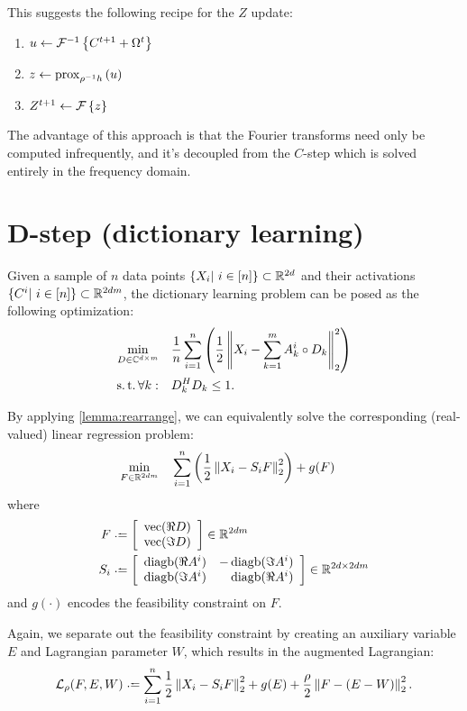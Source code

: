 \documentclass{article}
\DeclareMathOperator{\diagb}{diagb}
\DeclareMathOperator{\vectorize}{vec}
\renewcommand{\C}{\ensuremath{\mathbb{C}}}
\begin{document}
This suggests the following recipe for the $Z$ update:
\begin{enumerate}
\item $u \leftarrow \mathcal{F}^{-1}\left\{C^{t+1} + \Omega^t \right\}$
\item $z \leftarrow \operatorname{prox}_{\rho^{-1}h} \left(u\right)$
\item $Z^{t+1} \leftarrow \mathcal{F}\left\{z\right\}$
\end{enumerate}
The advantage of this approach is that the Fourier transforms need only be computed infrequently, and it's decoupled from
the $C$-step which is solved entirely in the frequency domain.

\section{D-step (dictionary learning)}
Given a sample of $n$ data points $\{X_i |~ i \in [n] \} \subset \mathbb{R}^{2d}$ and their activations 
$\{C^i |~ i \in [n] \} \subset \mathbb{R}^{2dm}$, the dictionary learning problem can be posed as the following
optimization:
\begin{align}
\min_{D\in \C^{d\times m}} \quad&\frac{1}{n} \sum_{i=1}^n \left(\frac{1}{2} \left\|X_i - \sum_{k=1}^m A^i_k
\circ D_k \right\|_2^2\right)\label{eq:siscd}\\
\suchthat \forall k: \quad & D_k^H D_k \leq 1.\notag
\end{align}

By applying \autoref{lemma:rearrange}, we can equivalently solve the corresponding (real-valued) linear regression problem:
\begin{align}
\min_{F\in \mathbb{R}^{2dm}} \quad& \sum_{i=1}^n \left(\frac{1}{2} \left\|X_i - S_i F\right\|_2^2\right) + g(F)\label{eq:siscdmf}
\end{align}
where
\begin{align*}
F &\defeq \left[\begin{array}{c}
\vectorize(\Re D)\\
\vectorize(\Im D)
\end{array}\right] \in \R^{2dm}\\
S_i &\defeq \left[\begin{array}{rr}
\diagb(\Re A^i) & -\diagb(\Im A^i)\\
\diagb(\Im A^i) & \diagb(\Re A^i)
\end{array}\right] \in \R^{2d \times 2dm}
\end{align*}
and $g(\cdot)$ encodes the feasibility constraint on $F$.

Again, we separate out the feasibility constraint by creating an auxiliary variable $E$ and Lagrangian parameter $W$, which results in the augmented Lagrangian:
\[
\Ell_\rho(F,E,W) \defeq \sum_{i=1}^n \frac{1}{2} \left\| X_i - S_i F\right\|_2^2 + g(E) + \frac{\rho}{2} \left\| F - (E - W)\right\|_2^2.
\]
\end{document}

